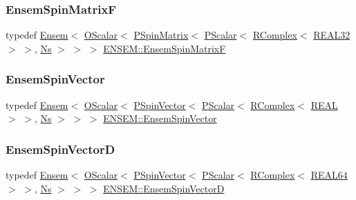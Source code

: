 \subsubsection{\texorpdfstring{EnsemSpinMatrixF}{EnsemSpinMatrixF}}
{\footnotesize\ttfamily typedef \mbox{\hyperlink{classENSEM_1_1Ensem}{Ensem}}$<$ \mbox{\hyperlink{classENSEM_1_1OScalar}{O\+Scalar}}$<$ \mbox{\hyperlink{classENSEM_1_1PSpinMatrix}{P\+Spin\+Matrix}}$<$ \mbox{\hyperlink{classENSEM_1_1PScalar}{P\+Scalar}}$<$ \mbox{\hyperlink{classENSEM_1_1RComplex}{R\+Complex}}$<$ \mbox{\hyperlink{namespaceENSEM_a7540d01191172323e9073283d772576d}{R\+E\+A\+L32}} $>$ $>$, \mbox{\hyperlink{namespaceENSEM_a6f05e048f9b2eb1a19131074f8abc25f}{Ns}} $>$ $>$ $>$ \mbox{\hyperlink{group__defs_gaa172105da4407f0e7ee578ef2860789d}{E\+N\+S\+E\+M\+::\+Ensem\+Spin\+MatrixF}}}

\mbox{\label{group__defs_gac817a4995f4c9a955aa536e3e9879184}} 
\subsubsection{\texorpdfstring{EnsemSpinVector}{EnsemSpinVector}}
{\footnotesize\ttfamily typedef \mbox{\hyperlink{classENSEM_1_1Ensem}{Ensem}}$<$ \mbox{\hyperlink{classENSEM_1_1OScalar}{O\+Scalar}}$<$ \mbox{\hyperlink{classENSEM_1_1PSpinVector}{P\+Spin\+Vector}}$<$ \mbox{\hyperlink{classENSEM_1_1PScalar}{P\+Scalar}}$<$ \mbox{\hyperlink{classENSEM_1_1RComplex}{R\+Complex}}$<$ \mbox{\hyperlink{namespaceENSEM_a6dd9aa6508168f545c861787e63ddd1e}{R\+E\+AL}} $>$ $>$, \mbox{\hyperlink{namespaceENSEM_a6f05e048f9b2eb1a19131074f8abc25f}{Ns}} $>$ $>$ $>$ \mbox{\hyperlink{group__defs_gac817a4995f4c9a955aa536e3e9879184}{E\+N\+S\+E\+M\+::\+Ensem\+Spin\+Vector}}}

\mbox{\label{group__defs_gae8a1e894c16ec6be00388813ab08115c}} 
\subsubsection{\texorpdfstring{EnsemSpinVectorD}{EnsemSpinVectorD}}
{\footnotesize\ttfamily typedef \mbox{\hyperlink{classENSEM_1_1Ensem}{Ensem}}$<$ \mbox{\hyperlink{classENSEM_1_1OScalar}{O\+Scalar}}$<$ \mbox{\hyperlink{classENSEM_1_1PSpinVector}{P\+Spin\+Vector}}$<$ \mbox{\hyperlink{classENSEM_1_1PScalar}{P\+Scalar}}$<$ \mbox{\hyperlink{classENSEM_1_1RComplex}{R\+Complex}}$<$ \mbox{\hyperlink{namespaceENSEM_a85b215b9f1f43715aebee01718e25082}{R\+E\+A\+L64}} $>$ $>$, \mbox{\hyperlink{namespaceENSEM_a6f05e048f9b2eb1a19131074f8abc25f}{Ns}} $>$ $>$ $>$ \mbox{\hyperlink{group__defs_gae8a1e894c16ec6be00388813ab08115c}{E\+N\+S\+E\+M\+::\+Ensem\+Spin\+VectorD}}}

